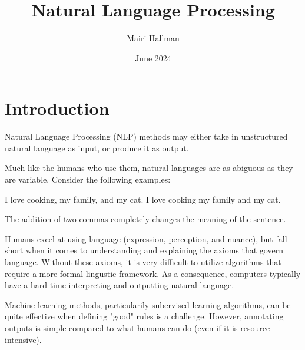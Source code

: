 \documentclass{article}
\title{Natural Language Processing}
\author{Mairi Hallman}
\date{June 2024}
\begin{document}
\maketitle

\newpage

\tableofcontents
\newpage

\section{Introduction}

Natural Language Processing (NLP) methods may either take in unstructured natural language as input, or produce it as output.

Much like the humans who use them, natural languages are as abiguous as they are variable. Consider the following examples: %

I love cooking, my family, and my cat.
I love cooking my family and my cat.

The addition of two commas completely changes the meaning of the sentence.

Humans excel at using language (expression, perception, and nuance), but fall short when it comes to understanding and explaining the axioms that govern language. Without these axioms, it is very difficult to utilize algorithms that require a more formal lingustic framework. As a consequence, computers typically have a hard time interpreting and outputting natural language.

Machine learning methods, particularily subervised learning algorithms, can be quite effective when defining "good" rules is a challenge. However, annotating outputs is simple compared to what humans can do (even if it is resource-intensive).
\\
\end{document}
